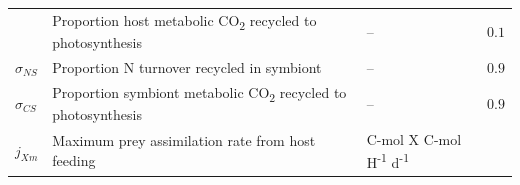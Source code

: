 \documentclass[]{elsarticle} %
\begin{document}
\begin{longtable}[c]{@{}llll@{}}
\begin{minipage}[t]{0.10\columnwidth}
\strut\end{minipage} &
\begin{minipage}[t]{0.45\columnwidth}\raggedright\strut
Proportion host metabolic CO\textsubscript{2} recycled to photosynthesis
\strut\end{minipage} &
\begin{minipage}[t]{0.25\columnwidth}\raggedright\strut
--
\strut\end{minipage} &
\begin{minipage}[t]{0.12\columnwidth}\raggedright\strut
\(0.1\)
\strut\end{minipage}\tabularnewline
\begin{minipage}[t]{0.10\columnwidth}\raggedright\strut
\(\sigma_{NS}\)
\strut\end{minipage} &
\begin{minipage}[t]{0.45\columnwidth}\raggedright\strut
Proportion N turnover recycled in symbiont
\strut\end{minipage} &
\begin{minipage}[t]{0.25\columnwidth}\raggedright\strut
--
\strut\end{minipage} &
\begin{minipage}[t]{0.12\columnwidth}\raggedright\strut
\(0.9\)
\strut\end{minipage}\tabularnewline
\begin{minipage}[t]{0.10\columnwidth}\raggedright\strut
\(\sigma_{CS}\)
\strut\end{minipage} &
\begin{minipage}[t]{0.45\columnwidth}\raggedright\strut
Proportion symbiont metabolic CO\textsubscript{2} recycled to
photosynthesis
\strut\end{minipage} &
\begin{minipage}[t]{0.25\columnwidth}\raggedright\strut
--
\strut\end{minipage} &
\begin{minipage}[t]{0.12\columnwidth}\raggedright\strut
\(0.9\)
\strut\end{minipage}\tabularnewline
\begin{minipage}[t]{0.10\columnwidth}\raggedright\strut
\(j_{Xm}\)
\strut\end{minipage} &
\begin{minipage}[t]{0.45\columnwidth}\raggedright\strut
Maximum prey assimilation rate from host feeding
\strut\end{minipage} &
\begin{minipage}[t]{0.25\columnwidth}\raggedright\strut
C-mol X C-mol H\textsuperscript{-1} d\textsuperscript{-1}

\end{minipage}
\end{longtable}
\end{document}
